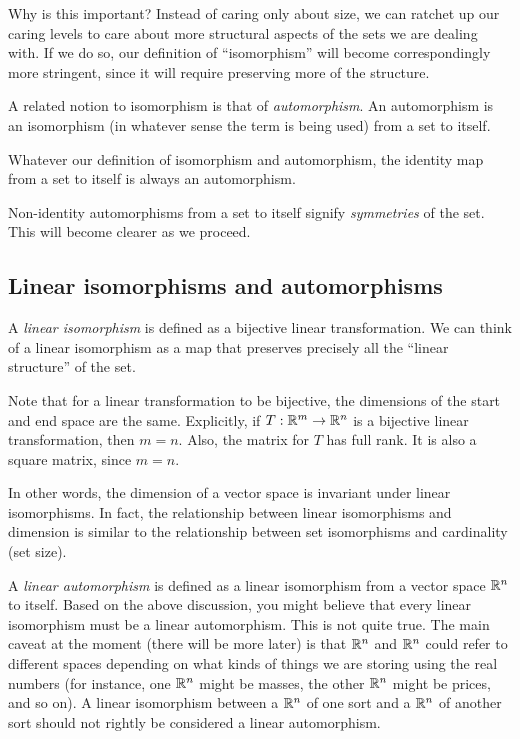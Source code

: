 \documentclass[10pt]{amsart}
\begin{document}
Why is this important? Instead of caring only about size, we can
ratchet up our caring levels to care about more structural aspects of
the sets we are dealing with. If we do so, our definition of
``isomorphism'' will become correspondingly more stringent, since it
will require preserving more of the structure.

A related notion to isomorphism is that of {\em automorphism}. An
automorphism is an isomorphism (in whatever sense the term is being
used) from a set to itself.

Whatever our definition of isomorphism and automorphism, the identity
map from a set to itself is always an automorphism.

Non-identity automorphisms from a set to itself signify {\em
  symmetries} of the set. This will become clearer as we proceed.

\subsection{Linear isomorphisms and automorphisms}

A {\em linear isomorphism} is defined as a bijective linear
transformation. We can think of a linear isomorphism as a map that
preserves precisely all the ``linear structure'' of the set.

Note that for a linear transformation to be bijective, the dimensions
of the start and end space are the same. Explicitly, if $T:\mathbb{R}^m \to
\mathbb{R}^n$ is a bijective linear transformation, then $m = n$. Also, the
matrix for $T$ has full rank. It is also a square matrix, since $m =
n$.

In other words, the dimension of a vector space is invariant under
linear isomorphisms. In fact, the relationship between linear
isomorphisms and dimension is similar to the relationship between set
isomorphisms and cardinality (set size).

A {\em linear automorphism} is defined as a linear isomorphism from a
vector space $\mathbb{R}^n$ to itself. Based on the above discussion, you
might believe that every linear isomorphism must be a linear
automorphism. This is not quite true. The main caveat at the moment
(there will be more later) is that $\mathbb{R}^n$ and $\mathbb{R}^n$ could refer to
different spaces depending on what kinds of things we are storing
using the real numbers (for instance, one $\mathbb{R}^n$ might be masses, the
other $\mathbb{R}^n$ might be prices, and so on). A linear isomorphism between
a $\mathbb{R}^n$ of one sort and a $\mathbb{R}^n$ of another sort should not rightly
be considered a linear automorphism.
\end{document}
